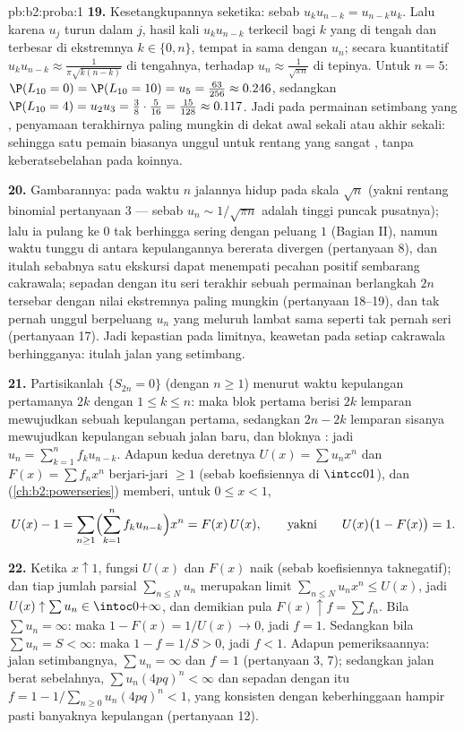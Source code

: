 \begin{solution}{pb:b2:proba:1}
\textbf{19.} Kesetangkupannya seketika: sebab $u_ku_{n-k} =
u_{n-k}u_k$. Lalu karena $u_j$ turun dalam $j$, hasil kali
$u_ku_{n-k}$ terkecil bagi $k$ yang di tengah dan terbesar di
ekstremnya $k \in \{0, n\}$, tempat ia sama dengan $u_n$;
secara kuantitatif $u_ku_{n-k} \approx \frac1{\pi\sqrt{k(n-k)}}$
di tengahnya, terhadap $u_n \approx \frac1{\sqrt{\pi n}}$ di
tepinya. Untuk $n = 5$: $\P(L_{10} = 0) = \P(L_{10} = 10) =
u_5 = \frac{63}{256} \approx 0.246$, sedangkan $\P(L_{10} = 4) =
u_2u_3 = \frac38\cdot\frac5{16} = \frac{15}{128} \approx
0.117$. Jadi pada permainan setimbang yang , penyamaan terakhirnya paling
mungkin di dekat awal sekali atau akhir sekali: sehingga satu pemain
biasanya unggul untuk rentang yang sangat , tanpa keberatsebelahan pada
koinnya.

\textbf{20.} Gambarannya: pada waktu $n$ jalannya hidup pada skala
$\sqrt n$ (yakni rentang binomial pertanyaan 3 --- sebab $u_n \sim
1/\sqrt{\pi n}$ adalah tinggi puncak pusatnya); lalu ia
pulang ke $0$ tak berhingga sering dengan peluang $1$ (Bagian
II), namun waktu tunggu di antara kepulangannya bererata divergen
(pertanyaan 8), dan itulah sebabnya satu ekskursi dapat menempati
pecahan positif sembarang cakrawala; sepadan dengan itu seri terakhir
sebuah permainan berlangkah $2n$ tersebar dengan nilai ekstremnya
paling mungkin (pertanyaan 18--19), dan tak pernah unggul berpeluang
$u_n$ yang meluruh lambat sama seperti tak pernah seri
(pertanyaan 17). Jadi kepastian pada limitnya, keawetan pada setiap
cakrawala berhingganya: itulah jalan yang setimbang.

\textbf{21.} Partisikanlah $\{S_{2n} = 0\}$ (dengan $n \geq 1$) menurut
waktu kepulangan pertamanya $2k$ dengan $1 \leq k \leq n$: maka blok pertama berisi
$2k$ lemparan mewujudkan sebuah kepulangan pertama, sedangkan $2n - 2k$
lemparan sisanya mewujudkan kepulangan sebuah jalan baru, dan bloknya
: jadi $u_n = \sum_{k=1}^nf_ku_{n-k}$. Adapun kedua deretnya
$U(x) = \sum u_nx^n$ dan $F(x) = \sum f_nx^n$ berjari-jari $\geq
1$ (sebab koefisiennya di $\intcc01$), dan 
(\cref{ch:b2:powerseries}) memberi, untuk $0 \leq x < 1$,
\[
U(x) - 1 = \sum_{n\geq1}\Bigl(\sum_{k=1}^n
f_ku_{n-k}\Bigr)x^n = F(x)\,U(x),
\qquad\text{yakni}\qquad
U(x)\bigl(1 - F(x)\bigr) = 1 .
\]

\textbf{22.} Ketika $x \uparrow 1$, fungsi $U(x)$ dan $F(x)$ naik
(sebab koefisiennya taknegatif); dan tiap jumlah parsial $\sum_{n\leq
N}u_n$ merupakan limit $\sum_{n\leq N}u_nx^n \leq U(x)$, jadi
$U(x) \uparrow \sum u_n \in \intoc0{+\infty}$, dan demikian pula
$F(x) \uparrow f = \sum f_n$. Bila $\sum u_n = \infty$: maka $1 -
F(x) = 1/U(x) \to 0$, jadi $f = 1$. Sedangkan bila $\sum u_n = S < \infty$:
maka $1 - f = 1/S > 0$, jadi $f < 1$. Adapun pemeriksaannya: jalan setimbangnya, $\sum u_n =
\infty$ dan $f = 1$ (pertanyaan 3, 7); sedangkan jalan berat sebelahnya, $\sum
u_n(4pq)^n < \infty$ dan sepadan dengan itu $f = 1 -
1/\sum_{n\geq0}u_n(4pq)^n < 1$, yang konsisten dengan
keberhinggaan hampir pasti banyaknya kepulangan (pertanyaan
12).


\end{solution}
